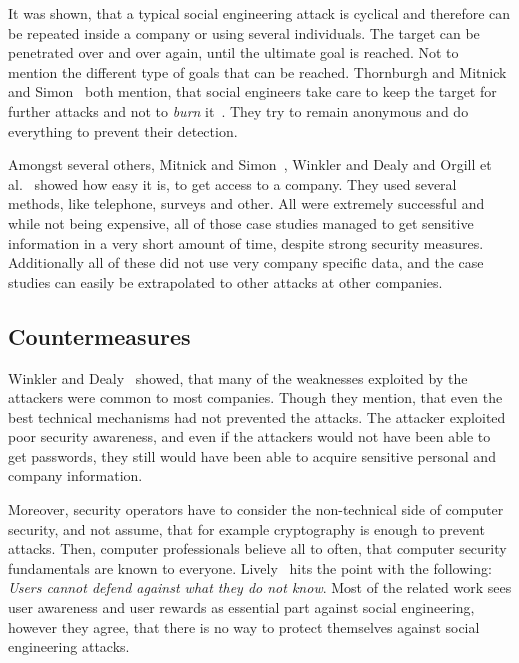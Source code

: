 It was shown, that a typical social engineering attack is cyclical and
therefore can be repeated inside a company or using several individuals. The
target can be penetrated over and over again, until the ultimate goal is
reached. Not to mention the different type of goals that can be reached.
Thornburgh \cite{thornburgh2004} and Mitnick and Simon~\cite{mitnick2003} both
mention, that social engineers take care to keep the target for further attacks
and not to \textit{burn} it~\cite{thornburgh2004}. They try to remain anonymous
and do everything to prevent their detection.

Amongst several others, Mitnick and Simon~\cite{mitnick2003}, Winkler and Dealy
\cite{winkler1995} and Orgill et al.~\cite{orgill2004} showed how easy it is,
to get access to a company. They used several methods, like telephone, surveys
and other. All were extremely successful and while not being expensive, all of
those case studies managed to get sensitive information in a very short amount
of time, despite strong security measures. Additionally all of these did not use very
company specific data, and the case studies can easily be extrapolated to other
attacks at other companies.

\subsection{Countermeasures}

Winkler and Dealy~\cite{winkler1995} showed, that many of the weaknesses
exploited by the attackers were common to most companies. Though they mention,
that even the best technical mechanisms had not prevented the attacks. The
attacker exploited poor security awareness, and even if the attackers would not
have been able to get passwords, they still would have been able to acquire
sensitive personal and company information.

Moreover, security operators have to consider the non-technical side of
computer security, and not assume, that for example cryptography is enough to
prevent attacks. Then, computer professionals believe all to often, that
computer security fundamentals are known to everyone. Lively~\cite{lively2003} hits
the point with the following: \textit{\glqq{}Users cannot defend against what
they do not know\grqq{}}. Most of the related work sees user awareness and user
rewards as essential part against social engineering, however they agree, that
there is no way to protect themselves against social engineering attacks.

